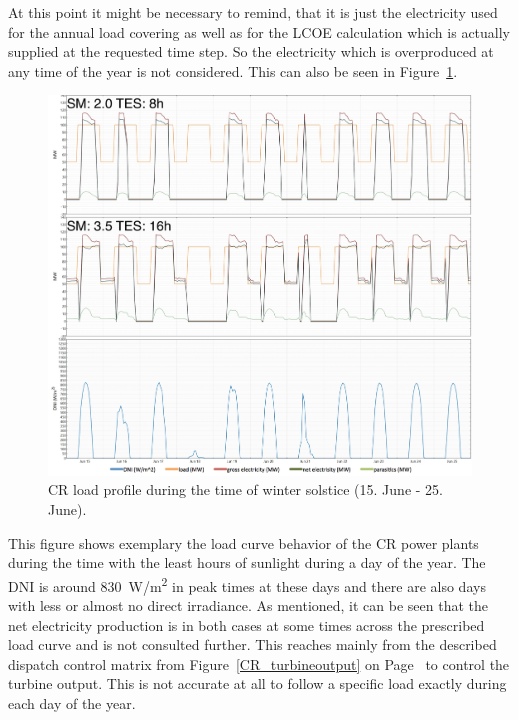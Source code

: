 At this point it might be necessary to remind, that it is just the electricity used for the annual load covering as well as for the LCOE calculation which is actually supplied at the requested time step. So the electricity which is overproduced at any time of the year is not considered. This can also be seen in Figure~\ref{CR_winter_load}. 
\begin{figure}[htbp]  
\centering
\includegraphics[width=1\linewidth]{FIG/CR_winter_load}
\caption[CR load profile during the time of winter solstice (15. June - 25. June).]{CR load profile during the time of winter solstice (15. June - 25. June).}\label{CR_winter_load}
\end{figure}
This figure shows exemplary the load curve behavior of the CR power plants during the time with the least hours of sunlight during a day of the year. The DNI is around 830~W/m\textsuperscript{2} in peak times at these days and there are also days with less or almost no direct irradiance. As mentioned, it can be seen that the net electricity production is in both cases at some times across the prescribed load curve and is not consulted further. This reaches mainly from the described dispatch control matrix from Figure~\ref{CR_turbineoutput} on Page~\pageref{CR_turbineoutput} to control the turbine output. This is not accurate at all to follow a specific load exactly during each day of the year. 

